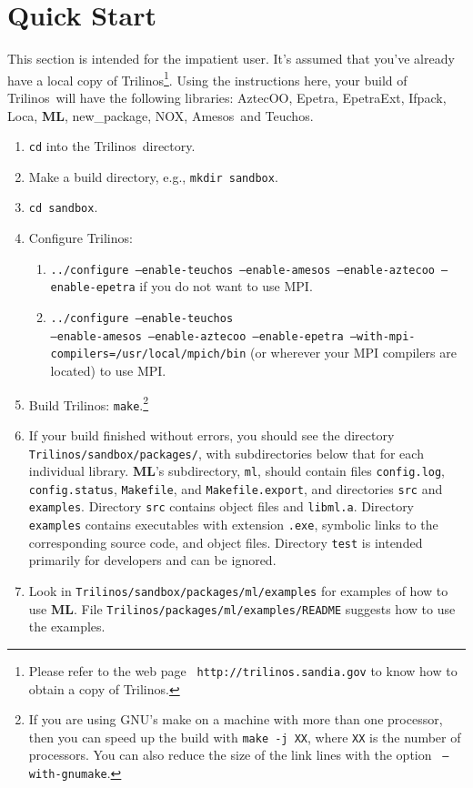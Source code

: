 \documentclass{article}[11pt]
\newcommand{\Aztecoo}  {{\sc AztecOO}}
\newcommand{\aztecoo}  {{\Aztecoo}}
\newcommand{\epetra}  {{\sc Epetra}}
\newcommand{\epetraext}  {{\sc EpetraExt}}
\newcommand{\ML}     {{\bf ML}}
\newcommand{\trilinos}  {{\sc Trilinos}}
\newcommand{\amesos}  {{\sc Amesos}}
\newcommand{\ifpack}  {{\sc Ifpack}}
\newcommand{\teuchos}  {{\sc Teuchos}}
\newcommand{\newpackage}  {{\sc new\_package}}
\newcommand{\nox}  {{\sc NOX}}
\newcommand{\loca}  {{\sc Loca}}
\newcommand{\be}  {\begin{enumerate}}
\newcommand{\ee}  {\end{enumerate}}
\begin{document}
\section{Quick Start}
\label{quick start}
%
This section is intended for the impatient user.
It's assumed that you've already have a local copy of
\trilinos\footnote{Please refer to the web page {\tt
  http://trilinos.sandia.gov} to know how to obtain a copy of
    \trilinos.}.
Using the instructions here, your build of \trilinos~will have the following
libraries: \aztecoo, \epetra, \epetraext, \ifpack, \loca, \ML, \newpackage,
\nox, \amesos~and \teuchos.
\be
\item \verb!cd! into the \trilinos~directory.
\item Make a build directory, e.g., \verb!mkdir sandbox!.
\item \verb!cd sandbox!.
\item Configure \trilinos:
  \be
  \item   {\tt ../configure --enable-teuchos --enable-amesos --enable-aztecoo
--enable-epetra}
 if you do not want to use MPI.
  \item   {\tt ../configure  --enable-teuchos \\
  --enable-amesos --enable-aztecoo --enable-epetra --with-mpi-compilers=/usr/local/mpich/bin} (or wherever your MPI compilers are
located) to use MPI.
  \ee
\item Build \trilinos: \verb!make!.\footnote{If you are using GNU's make on a
machine with more than one processor, then you can speed up the
build with {\tt make -j XX}, where {\tt XX} is the number of processors.  You
can also reduce the size of the link lines with the option {\tt
--with-gnumake}.}
\item If your build finished without errors, you should see the directory\\
\verb!Trilinos/sandbox/packages/!, with subdirectories below that for
each individual library.   \ML's subdirectory, \verb!ml!, should contain
files \verb!config.log!, \verb!config.status!, \verb!Makefile!, and
\verb!Makefile.export!, and directories \verb!src! and \verb!examples!.
Directory \verb!src! contains object files and \verb!libml.a!.
Directory \verb!examples! contains executables with extension \verb!.exe!,
symbolic links to the corresponding source code, and object files.
Directory \verb!test! is intended primarily for developers and can be ignored.
\item Look in \verb!Trilinos/sandbox/packages/ml/examples! for examples of how
to use \ML. File \verb!Trilinos/packages/ml/examples/README! suggests how to
use the examples.
\ee
%
%
\end{document}
